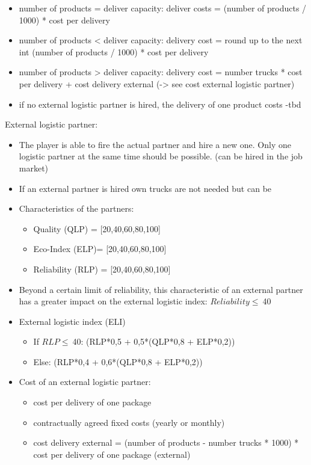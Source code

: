 \documentclass[11pt,titlepage,oneside,openany]{book}
\begin{document}
\begin{itemize}
\begin{itemize}
        \item number of products = deliver capacity: deliver costs  = (number of products / 1000) * cost per delivery
        \item number of products < deliver capacity: delivery cost = round up to the next int (number of products / 1000) * cost per delivery
        \item number of products > deliver capacity: delivery cost = number trucks * cost per delivery + cost delivery external (-> see cost external logistic partner) 
        \item if no external logistic partner is hired, the delivery of one product costs -tbd
    \end{itemize}
\end{itemize}

External logistic partner:
\begin{itemize}
    \item The player is able to fire the actual partner and hire a new one. Only one logistic partner at the same time should be possible. (can be hired in the job market)
    \item If an external partner is hired own trucks are not needed but can be
    \item Characteristics of the partners:
    \begin{itemize}
        \item Quality (QLP) = [20,40,60,80,100]
        \item Eco-Index (ELP)= [20,40,60,80,100]
        \item Reliability (RLP) = [20,40,60,80,100]
    \end{itemize}
    \item Beyond a certain limit of reliability, this characteristic of an external partner has a greater impact on the external logistic index: $Reliability \leq \ $40
    \item External logistic index (ELI)
    \begin{itemize}
        \item If $RLP \leq \ $40: (RLP*0,5 + 0,5*(QLP*0,8 + ELP*0,2))
        \item Else: (RLP*0,4 + 0,6*(QLP*0,8 + ELP*0,2))
    \end{itemize}
    \item Cost of an external logistic partner:
    \begin{itemize}
        \item cost per delivery of one package 
        \item contractually agreed fixed costs (yearly or monthly)
        \item cost delivery external = (number of products - number trucks * 1000) * cost per delivery of one package (external)
    \end{itemize}
\end{itemize}
\end{document}
